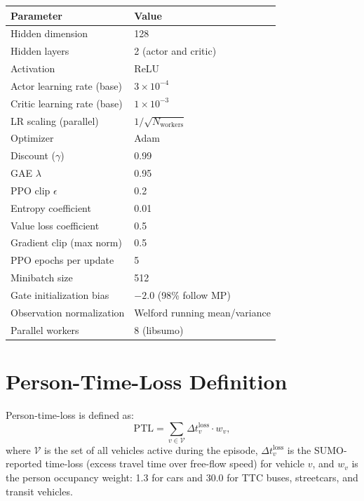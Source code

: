 \documentclass{article}
\begin{document}
\begin{table}[H]
  \centering
  \small
  \begin{tabular}{@{}ll@{}}
    \toprule
    \textbf{Parameter} & \textbf{Value} \\
    \midrule
    Hidden dimension          & 128 \\
    Hidden layers             & 2 (actor and critic) \\
    Activation                & ReLU \\
    Actor learning rate (base)       & $3 \times 10^{-4}$ \\
    Critic learning rate (base)      & $1 \times 10^{-3}$ \\
    LR scaling (parallel)    & $1/\sqrt{N_{\mathrm{workers}}}$ \\
    Optimizer                 & Adam \\
    Discount ($\gamma$)       & 0.99 \\
    GAE $\lambda$             & 0.95 \\
    PPO clip $\epsilon$       & 0.2 \\
    Entropy coefficient       & 0.01 \\
    Value loss coefficient    & 0.5 \\
    Gradient clip (max norm)  & 0.5 \\
    PPO epochs per update     & 5 \\
    Minibatch size            & 512 \\
    Gate initialization bias  & $-2.0$ (98\% follow MP) \\
    Observation normalization & Welford running mean/variance \\
    Parallel workers          & 8 (libsumo) \\
    \bottomrule
  \end{tabular}
\end{table}


\section{Person-Time-Loss Definition}
\label{app:ptl}

Person-time-loss is defined as:
\begin{equation}
  \mathrm{PTL} = \sum_{v \in \mathcal{V}} \Delta t_v^{\mathrm{loss}} \cdot w_v,
\end{equation}
where $\mathcal{V}$ is the set of all vehicles active during the episode, $\Delta t_v^{\mathrm{loss}}$ is the SUMO-reported time-loss (excess travel time over free-flow speed) for vehicle $v$, and $w_v$ is the person occupancy weight: 1.3 for cars and 30.0 for TTC buses, streetcars, and transit vehicles.
\end{document}

